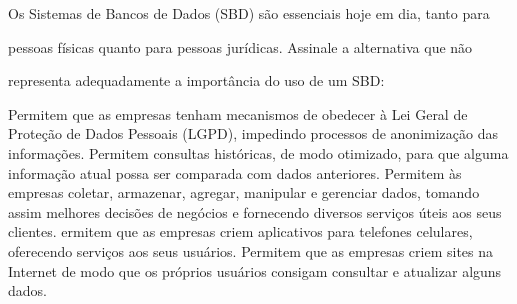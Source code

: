 \documentclass[12pt, addpoints]{exam}
\begin{document}
    \begin{questions}

    \newpage
    \question

Os Sistemas de Bancos de Dados (SBD) são essenciais hoje em dia, tanto para

pessoas físicas quanto para pessoas jurídicas. Assinale a alternativa que não

representa adequadamente a importância do uso de um SBD:
\begin{choices}
\choice Permitem que as empresas tenham mecanismos de obedecer à Lei Geral de Proteção de Dados Pessoais (LGPD), impedindo processos de anonimização das informações.
\choice Permitem consultas históricas, de modo otimizado, para que alguma informação atual possa ser comparada com dados anteriores.
\choice Permitem às empresas coletar, armazenar, agregar, manipular e gerenciar dados, tomando assim melhores decisões de negócios e fornecendo diversos serviços úteis aos seus clientes.
\choice ermitem que as empresas criem aplicativos para telefones celulares, oferecendo serviços aos seus usuários.
\choice Permitem que as empresas criem sites na Internet de modo que os próprios usuários consigam consultar e atualizar alguns dados.
\end{choices}



    \end{questions}
    
\end{document}
